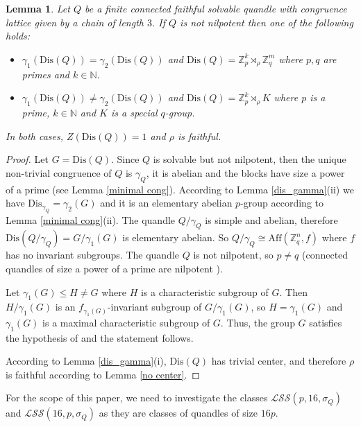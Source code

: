 \documentclass[a4paper, english, 9pt]{amsart}
\theoremstyle{plain}
\newtheorem{lemma}[theorem]{Lemma}
\theoremstyle{definition}
\def\aff#1{\mathrm{Aff}#1}
\def\dis{\mathrm{Dis}}
\def\comment#1{{\color{red} #1}}
\def\Z{\mathbb Z}
\def\LSS{\mathcal{LSS}}
\begin{document}
\begin{lemma}\label{dis for 3-chains}
    Let $Q$ be a finite connected faithful solvable quandle with congruence lattice given by a chain of length $3$. If $Q$ is not nilpotent then one of the following holds: 
    \begin{itemize}
        \item[(i)] $\gamma_1(\dis(Q))=\gamma_2(\dis(Q))$ and $\dis(Q)=\Z_p^k\rtimes_\rho \Z_q^m$ where $p,q$ are primes and $k\in \mathbb{N}$.  
        \item[(ii)] $\gamma_1(\dis(Q))\neq\gamma_2(\dis(Q))$ and $\dis(Q)=\Z_p^k\rtimes_\rho K$ where $p$ is a prime, $k\in \mathbb{N}$ and $K$ is a special $q$-group. 
    \end{itemize}
In both cases, $Z(\dis(Q))=1$ and $\rho$ is faithful.
\end{lemma}

\begin{proof}
Let $G=\dis(Q)$. Since $Q$ is solvable but not nilpotent, then the unique non-trivial congruence of $Q$ is $\gamma_Q$, it is abelian and the blocks have size a power of a prime (see Lemma \ref{minimal cong}). According to Lemma \ref{dis_gamma}(ii) we have $\dis_{\gamma_Q}=\gamma_2(G)$ and it is an elementary abelian $p$-group according to Lemma \ref{minimal cong}(ii). The quandle $Q/\gamma_Q$ is simple and abelian, therefore $\dis(Q/\gamma_Q)=G/\gamma_1(G)$ is elementary abelian. So $Q/\gamma_Q\cong \aff(\Z_q^n,f)$ where $f$ has no invariant subgroups. The quandle $Q$ is not nilpotent, so $p\neq q$ (connected quandles of size a power of a prime are nilpotent \cite[Theorem 1.4]{CP}).

Let $\gamma_1(G)\leq H\neq G$ where $H$ is a characteristic subgroup of $G$. Then $H/\gamma_1(G)$ is an $f_{\gamma_1(G)}$-invariant subgroup of $G/\gamma_1(G)$, so $H=\gamma_1(G)$ and $\gamma_1(G)$ is a maximal characteristic subgroup of $G$. Thus, the group $G$ satisfies the hypothesis of \cite[Proposition 5.7]{Principal} and the statement follows. 

According to Lemma \ref{dis_gamma}(i), $\dis(Q)$ has trivial center, and therefore $\rho$ is faithful according to Lemma \ref{no center}. 
\end{proof}



For the scope of this paper, we need to investigate the classes $\LSS(p,16,\sigma_Q)$ and $\LSS(16,p,\sigma_Q)$ as they are classes of quandles of size $16p$.
\end{document}
